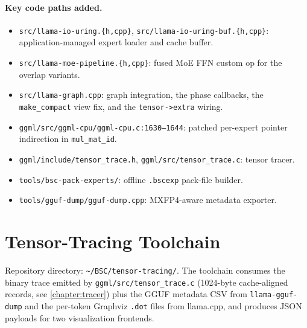 \paragraph{Key code paths added.}\hspace{0pt}
\begin{itemize}\setlength{\itemsep}{0pt}
  \item \texttt{src/llama-io-uring.\{h,cpp\}}, \texttt{src/llama-io-uring-buf.\{h,cpp\}}: application-managed expert loader and cache buffer.
  \item \texttt{src/llama-moe-pipeline.\{h,cpp\}}: fused MoE FFN custom op for the overlap variants.
  \item \texttt{src/llama-graph.cpp}: graph integration, the phase callbacks, the \texttt{make\_compact} view fix, and the \texttt{tensor->extra} wiring.
  \item \texttt{ggml/src/ggml-cpu/ggml-cpu.c:1630--1644}: patched per-expert pointer indirection in \texttt{mul\_mat\_id}.
  \item \texttt{ggml/include/tensor\_trace.h}, \texttt{ggml/src/tensor\_trace.c}: tensor tracer.
  \item \texttt{tools/bsc-pack-experts/}: offline \texttt{.bscexp} pack-file builder.
  \item \texttt{tools/gguf-dump/gguf-dump.cpp}: MXFP4-aware metadata exporter.
\end{itemize}


\section{Tensor-Tracing Toolchain}\label{sec:art-tracing}

Repository directory: \texttt{\textasciitilde/BSC/tensor-tracing/}. The toolchain consumes the binary trace emitted by \texttt{ggml/src/tensor\_trace.c} (1024-byte cache-aligned records, see \autoref{chapter:tracer}) plus the GGUF metadata CSV from \texttt{llama-gguf-dump} and the per-token Graphviz \texttt{.dot} files from llama.cpp, and produces JSON payloads for two visualization frontends.

